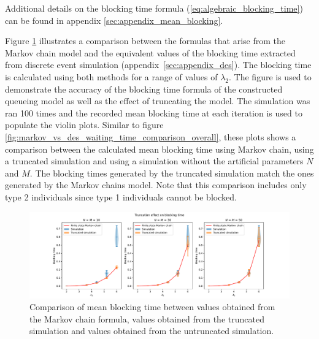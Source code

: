 Additional details on the blocking time formula 
(\ref{eq:algebraic_blocking_time}) can be found in appendix 
\ref{sec:appendix_mean_blocking}. 

Figure \ref{fig:markov_vs_des_blocking_time_comparison} illustrates a comparison 
between the formulas that arise from the Markov chain model and the equivalent 
values of the blocking time extracted from discrete event simulation
(appendix~\ref{sec:appendix_des}).
The blocking time is calculated using both methods for a range of values of
\(\lambda_2\).
The figure is used to demonstrate the accuracy of the blocking time formula of
the constructed queueing model as well as the effect of truncating the model.
The simulation was ran 100 times and the recorded mean blocking time at each 
iteration is used to populate the violin plots.
Similar to figure \ref{fig:markov_vs_des_waiting_time_comparison_overall}, these
plots shows a comparison between the calculated mean blocking time using Markov 
chain, using a truncated simulation and using a simulation without the
artificial parameters \(N\) and \(M\).
The blocking times generated by the truncated simulation match the ones
generated by the Markov chains model.
Note that this comparison includes only type 2 individuals since type 1 
individuals cannot be blocked.

\begin{figure}[H]
    \centering
    \includegraphics[width=\textwidth]{imgs/truncation_effect/blocking/main.pdf}
    \caption{
        Comparison of mean blocking time between values obtained from the Markov 
        chain formula, values obtained from the truncated simulation and values
        obtained from the untruncated simulation.
    }
    \label{fig:markov_vs_des_blocking_time_comparison}
\end{figure}
